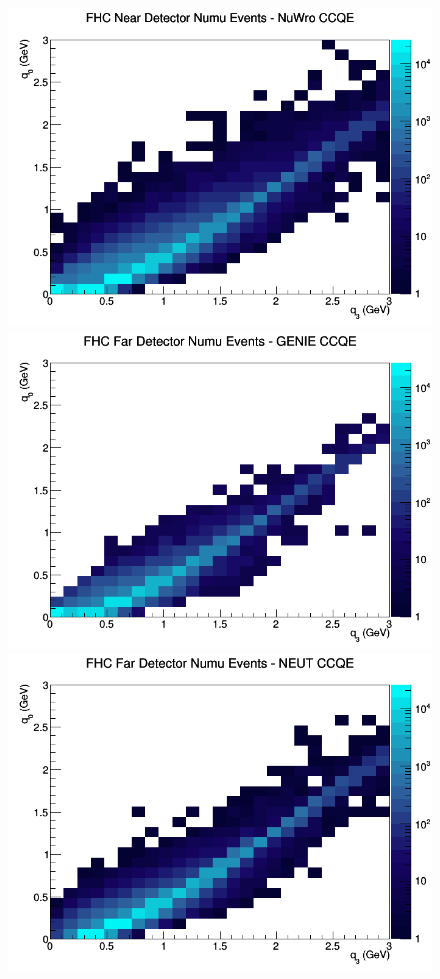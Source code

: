 \begin{figure}[h]
\includegraphics[width=\linewidth]{eff_q0_q3/LAr/CCQE_FHC_ND_numu_q3_q0_NuWro.png}
\endminipage
\newline
{}
\includegraphics[width=\linewidth]{eff_q0_q3/LAr/CCQE_FHC_FD_numu_q3_q0_GENIE.png}
\endminipage
{}
\includegraphics[width=\linewidth]{eff_q0_q3/LAr/CCQE_FHC_FD_numu_q3_q0_NEUT.png}

\end{figure}
